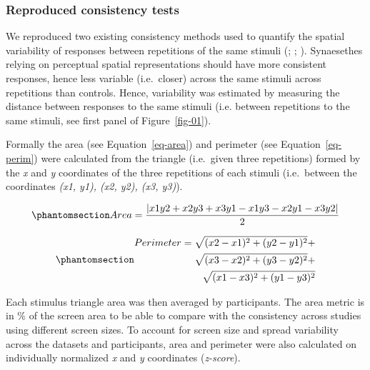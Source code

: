 \documentclass[
  man,
  floatsintext,
  longtable,
  a4paper,
  nolmodern,
  notxfonts,
  notimes,
  colorlinks=true,linkcolor=blue,citecolor=blue,urlcolor=blue]{apa7}
\begin{document}
\subsubsection{Reproduced consistency
tests}\label{reproduced-consistency-tests}


We reproduced two existing consistency methods used to quantify the
spatial variability of responses between repetitions of the same stimuli
(;
;
). Synaesethes relying on perceptual
spatial representations should have more consistent responses, hence
less variable (i.e.~closer) across the same stimuli across repetitions
than controls. Hence, variability was estimated by measuring the
distance between responses to the same stimuli (i.e. between repetitions
to the same stimuli, see first panel of Figure~\ref{fig-01}).

Formally the area (see Equation~\ref{eq-area}) and perimeter (see
Equation~\ref{eq-perim}) were calculated from the triangle (i.e.~given
three repetitions) formed by the \emph{x} and \emph{y} coordinates of
the three repetitions of each stimuli (i.e.~between the coordinates
\emph{(x1, y1), (x2, y2), (x3, y3)}).

\begin{equation}\phantomsection\label{eq-area}{
Area = \frac{|x1y2  +  x2y3  +  x3y1 \mathbin{-} x1y3 \mathbin{-}  x2y1 \mathbin{-} x3y2|}{2}
}\end{equation}

\begin{equation}\phantomsection\label{eq-perim}{
\begin{split}
Perimeter = \sqrt{(x2 \mathbin{-} x1)^2 + (y2 \mathbin{-} y1)^2} + \\ \sqrt{(x3 \mathbin{-} x2)^2 + (y3 \mathbin{-} y2)^2} + \\ \sqrt{(x1 \mathbin{-}  x3)^2 + (y1 \mathbin{-} y3)^2}
\end{split}
}\end{equation}

Each stimulus
triangle area was then averaged by participants. The area metric is in
\% of the screen area to be able to compare with the consistency across
studies using different screen sizes. To account for screen size and
spread variability across the datasets and participants, area and
perimeter were also calculated on individually normalized \emph{x} and
\emph{y} coordinates (\emph{z-score}).
\end{document}
